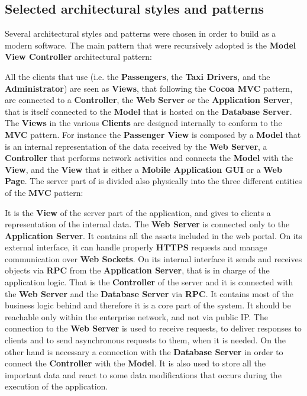 \subsection{Selected architectural styles and patterns}
Several architectural styles and patterns were chosen in order to build \myTaxiService{} as a modern software.
The main pattern that were recursively adopted is the \textbf{Model View Controller} architectural pattern:
\begin{itemize}
	 All the clients that use \myTaxiService{} (i.e. the \textbf{Passengers}, the \textbf{Taxi Drivers}, and the \textbf{Administrator}) are seen as \textbf{Views}, that following the \textbf{Cocoa MVC} pattern, are connected to a \textbf{Controller}, the \textbf{Web Server} or the \textbf{Application Server}, that is itself connected to the \textbf{Model} that is hosted on the \textbf{Database Server}.
	 The \textbf{Views} in the various \textbf{Clients} are designed internally to conform to the \textbf{MVC} pattern. For instance the \textbf{Passenger View} is composed by a \textbf{Model} that is an internal representation of the data received by the \textbf{Web Server}, a \textbf{Controller} that performs network activities and connects the \textbf{Model} with the \textbf{View}, and the \textbf{View} that is either a \textbf{Mobile Application GUI} or a \textbf{Web Page}.
	 The server part of \myTaxiService{} is divided also physically into the three different entities of the \textbf{MVC} pattern:
	\begin{itemize}
		 It is the \textbf{View} of the server part of the application, and gives to clients a representation of the internal data. The \textbf{Web Server} is connected only to the \textbf{Application Server}. It contains all the assets included in the web portal. On its external interface, it can handle properly \textbf{HTTPS} requests and manage communication over \textbf{Web Sockets}. On its internal interface it sends and receives objects via \textbf{RPC} from the \textbf{Application Server}, that is in charge of the application logic.
		 That is the \textbf{Controller} of the server and it is connected with the \textbf{Web Server} and the \textbf{Database Server} via \textbf{RPC}. It contains most of the business logic behind \myTaxiService{} and therefore it is a core part of the system. It should be reachable only within the enterprise network, and not via public IP. The connection to the \textbf{Web Server} is used to receive requests, to deliver responses to clients and to send asynchronous requests to them, when it is needed. On the other hand is necessary a connection with the \textbf{Database Server} in order to connect the \textbf{Controller} with the \textbf{Model}. It is also used to store all the important data and react to some data modifications that occurs during the execution of the application.

\end{itemize}
\end{itemize}
